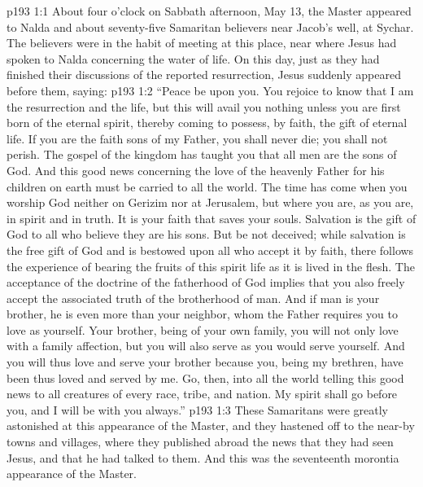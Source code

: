 %
\vs p193 1:1 About four o’clock on Sabbath afternoon, May 13, the Master appeared to Nalda and about seventy\hyp{}five Samaritan believers near Jacob’s well, at Sychar. The believers were in the habit of meeting at this place, near where Jesus had spoken to Nalda concerning the water of life. On this day, just as they had finished their discussions of the reported resurrection, Jesus suddenly appeared before them, saying:
\pc \vs p193 1:2 \textcolor{ubdarkred}{“Peace be upon you. You rejoice to know that I am the resurrection and the life, but this will avail you nothing unless you are first born of the eternal spirit, thereby coming to possess, by faith, the gift of eternal life. If you are the faith sons of my Father, you shall never die; you shall not perish. The gospel of the kingdom has taught you that all men are the sons of God. And this good news concerning the love of the heavenly Father for his children on earth must be carried to all the world. The time has come when you worship God neither on Gerizim nor at Jerusalem, but where you are, as you are, in spirit and in truth. It is your faith that saves your souls. Salvation is the gift of God to all who believe they are his sons. But be not deceived; while salvation is the free gift of God and is bestowed upon all who accept it by faith, there follows the experience of bearing the fruits of this spirit life as it is lived in the flesh. The acceptance of the doctrine of the fatherhood of God implies that you also freely accept the associated truth of the brotherhood of man. And if man is your brother, he is even more than your neighbor, whom the Father requires you to love as yourself. Your brother, being of your own family, you will not only love with a family affection, but you will also serve as you would serve yourself. And you will thus love and serve your brother because you, being my brethren, have been thus loved and served by me. Go, then, into all the world telling this good news to all creatures of every race, tribe, and nation. My spirit shall go before you, and I will be with you always.”}
\pc \vs p193 1:3 These Samaritans were greatly astonished at this appearance of the Master, and they hastened off to the near\hyp{}by towns and villages, where they published abroad the news that they had seen Jesus, and that he had talked to them. And this was the seventeenth morontia appearance of the Master.
